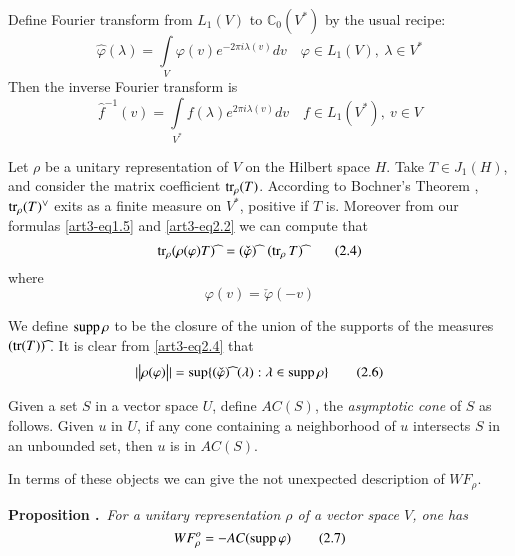 Define Fourier transform from $L_{1}(V)$ to $\mathbb{C}_{0}(V^{*})$ by the usual recipe:
\begin{equation*}
\widehat{\varphi}(\lambda)=\int\limits_{V}\varphi(v)e^{-2\pi i\lambda(v)}dv\quad \varphi\in L_{1}(V), \ \lambda\in V^{*}\tag{2.2}\label{art3-eq2.2}
\end{equation*}
Then the inverse Fourier transform is
\begin{equation*}
\widehat{f}^{-1}(v)=\int\limits_{V^{*}}f(\lambda)e^{2\pi i\lambda(v)}dv\quad f\in L_{1}(V^{*}), \ v\in V\tag{2.3}\label{art3-eq2.3}
\end{equation*}

Let $\rho$ be a unitary representation of $V$ on the Hilbert space $H$. Take $T\in J_{1}(H)$, and consider the matrix coefficient $\operatorname{tr}_{\rho}(T)$. According to Bochner's Theorem \cite{art3-R-S}, $\tr_{\rho}(T)\spcheck$ exits as a finite measure on $V^{*}$, positive if $T$ is. Moreover from our formulas \eqref{art3-eq1.5} and \eqref{art3-eq2.2} we can compute that
\begin{equation*}
\tr_{\rho}(\rho(\varphi)T)\sphat \  =(\check{\varphi})\sphat \ \ (\tr_{\rho}T)\sphat\tag{2.4}\label{art3-eq2.4}
\end{equation*}
where
\begin{equation*}
\varphi(v)=\check{\varphi}(-v)\tag{2.5}\label{art3-eq2.5}
\end{equation*}

We define $\operatorname{supp} \rho$ to be the closure of the union of the supports of the measures $(\tr (T))\sphat$. It is clear from \eqref{art3-eq2.4} that
\begin{equation*}
|\big| \rho(\varphi)\big||=\sup \{(\check{\varphi})\sphat \ (\lambda):\lambda \in \supp \rho\}\tag{2.6}\label{art3-eq2.6}
\end{equation*}

Given a set $S$ in a vector space $U$, define $AC(S)$, the {\em asymptotic cone} of $S$ as follows. Given $u$ in $U$, if any cone containing a neighborhood of $u$ intersects $S$ in an unbounded set, then $u$ is in $AC(S)$.

In terms of these objects we can give the not unexpected description of $WF_{\rho}$.

\medskip
\noindent
{\bf Proposition .\label{art3-prop2.1}}~{\em For a unitary representation $\rho$ of a vector space $V$, one has}
\begin{equation*}
WF^{o}_{\rho}=-AC(\operatorname{supp} \varphi)\tag{2.7}\label{art3-eq2.7}
\end{equation*}\pageoriginale

